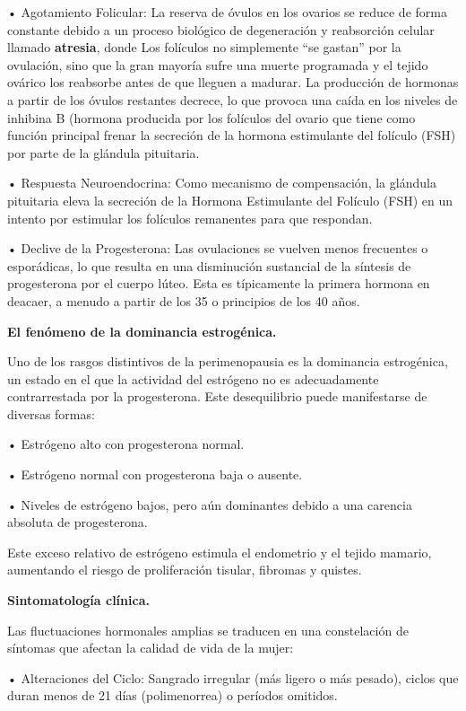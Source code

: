 \documentclass[
  spanish,
]{article}
\begin{document}
• Agotamiento Folicular: La reserva de óvulos en los ovarios se reduce de forma constante debido a un proceso biológico de degeneración y reabsorción celular llamado \textbf{atresia}, donde Los folículos no simplemente ``se gastan'' por la ovulación, sino que la gran mayoría sufre una muerte programada y el tejido ovárico los reabsorbe antes de que lleguen a madurar. La producción de hormonas a partir de los óvulos restantes decrece, lo que provoca una caída en los niveles de inhibina B (hormona producida por los folículos del ovario que tiene como función principal frenar la secreción de la hormona estimulante del folículo (FSH) por parte de la glándula pituitaria.

• Respuesta Neuroendocrina: Como mecanismo de compensación, la glándula pituitaria eleva la secreción de la Hormona Estimulante del Folículo (FSH) en un intento por estimular los folículos remanentes para que respondan.

• Declive de la Progesterona: Las ovulaciones se vuelven menos frecuentes o esporádicas, lo que resulta en una disminución sustancial de la síntesis de progesterona por el cuerpo lúteo. Esta es típicamente la primera hormona en deacaer, a menudo a partir de los 35 o principios de los 40 años.

\textbf{El fenómeno de la dominancia estrogénica.}

Uno de los rasgos distintivos de la perimenopausia es la dominancia estrogénica, un estado en el que la actividad del estrógeno no es adecuadamente contrarrestada por la progesterona. Este desequilibrio puede manifestarse de diversas formas:

• Estrógeno alto con progesterona normal.

• Estrógeno normal con progesterona baja o ausente.

• Niveles de estrógeno bajos, pero aún dominantes debido a una carencia absoluta de progesterona.

Este exceso relativo de estrógeno estimula el endometrio y el tejido mamario, aumentando el riesgo de proliferación tisular, fibromas y quistes.

\textbf{Sintomatología clínica.}

Las fluctuaciones hormonales amplias se traducen en una constelación de síntomas que afectan la calidad de vida de la mujer:

• Alteraciones del Ciclo: Sangrado irregular (más ligero o más pesado), ciclos que duran menos de 21 días (polimenorrea) o períodos omitidos.
\end{document}
